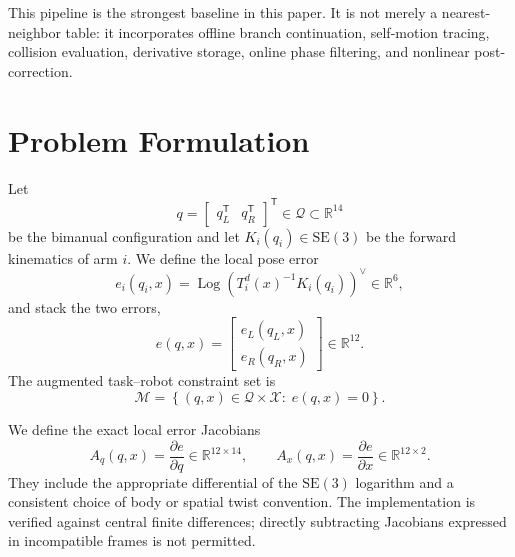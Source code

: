 \documentclass[preprint,12pt]{elsarticle}
\DeclareMathOperator{\Log}{Log}
\newcommand{\R}{\mathbb{R}}
\newcommand{\SE}{\mathrm{SE}(3)}
\newcommand{\T}{^{\mathsf T}}
\begin{document}
This pipeline is the strongest baseline in this paper. It is not merely a nearest-neighbor table: it incorporates offline branch continuation, self-motion tracing, collision evaluation, derivative storage, online phase filtering, and nonlinear post-correction.

\section{Problem Formulation}
\label{sec:problem}

Let
\begin{equation}
q=\begin{bmatrix}q_L\T&q_R\T\end{bmatrix}\T\in\mathcal Q\subset\R^{14}
\end{equation}
be the bimanual configuration and let $K_i(q_i)\in\SE$ be the forward kinematics of arm $i$. We define the local pose error
\begin{equation}
e_i(q_i,x)
=
\Log\!\left(T_i^d(x)^{-1}K_i(q_i)\right)^\vee
\in\R^6,
\label{eq:pose_error}
\end{equation}
and stack the two errors,
\begin{equation}
e(q,x)
=
\begin{bmatrix}e_L(q_L,x)\\e_R(q_R,x)\end{bmatrix}
\in\R^{12}.
\label{eq:stacked_error}
\end{equation}
The augmented task--robot constraint set is
\begin{equation}
\mathcal M
=
\left\{(q,x)\in\mathcal Q\times\mathcal X:\;e(q,x)=0\right\}.
\label{eq:augmented_manifold}
\end{equation}

We define the exact local error Jacobians
\begin{equation}
A_q(q,x)=\frac{\partial e}{\partial q}\in\R^{12\times14},
\qquad
A_x(q,x)=\frac{\partial e}{\partial x}\in\R^{12\times2}.
\label{eq:error_jacobians}
\end{equation}
They include the appropriate differential of the $\SE$ logarithm and a consistent choice of body or spatial twist convention. The implementation is verified against central finite differences; directly subtracting Jacobians expressed in incompatible frames is not permitted.
\end{document}

